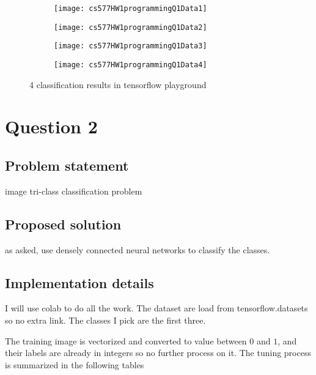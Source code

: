 \documentclass{article}
\begin{document}
\begin{figure}[h!]
    \centering
    \begin{subfigure}{.24\textwidth}
        \centering
        \texttt{[image: cs577HW1programmingQ1Data1]}
    \end{subfigure}
    \begin{subfigure}{.24\textwidth}
        \centering
        \texttt{[image: cs577HW1programmingQ1Data2]}
    \end{subfigure}
    \begin{subfigure}{.24\textwidth}
        \centering
        \texttt{[image: cs577HW1programmingQ1Data3]}
    \end{subfigure}
    \begin{subfigure}{.24\textwidth}
        \centering
        \texttt{[image: cs577HW1programmingQ1Data4]}
    \end{subfigure}
    \caption{4 classification results in tensorflow playground}
    \label{fig:classificationPlayground}
\end{figure}

\section*{Question 2}
\subsection*{Problem statement}
image tri-class classification problem
\subsection*{Proposed solution}
as asked, use densely connected neural networks to classify the classes.
\subsection*{Implementation details}
I will use colab to do all the work. The dataset are load from tensorflow.datasets so no extra link. The classes I pick are the first three.

The training image is vectorized and converted to value between \(0\) and \(1\), and their labels are already in integers so no further process on it.
The tuning process is summarized in the following tables
\end{document}
